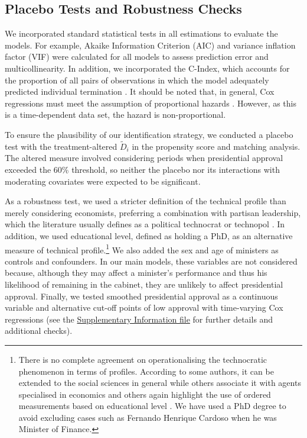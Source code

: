 \documentclass[12pt,halfline,a4paper]{ouparticle}
\begin{document}
\subsection{Placebo Tests and Robustness Checks}
\label{sec3.4}

We incorporated standard statistical tests in all estimations to evaluate the models. For example, Akaike Information Criterion (AIC) and variance inflation factor (VIF) were calculated for all models to assess prediction error and multicollinearity. In addition, we incorporated the C-Index, which accounts for the proportion of all pairs of observations in which the model adequately predicted individual termination \citep[][see also \citeauthor{Adolph2020}, \citeyear{Adolph2020}]{Harrell1996}. It should be noted that, in general, Cox regressions must meet the assumption of proportional hazards \citep{BoxSteffensmeier2004}. However, as this is a time-dependent data set, the hazard is non-proportional. 

To ensure the plausibility of our identification strategy, we conducted a placebo test with the treatment-altered $\widetilde{D}_{i}$ in the propensity score and matching analysis. The altered measure involved considering periods when presidential approval exceeded the 60\% threshold, so neither the placebo nor its interactions with moderating covariates were expected to be significant.

As a robustness test, we used a stricter definition of the technical profile than merely considering economists, preferring a combination with partisan leadership, which the literature usually defines as a political technocrat or technopol \citep{GonzalezBustamante2018, Joignant2011}. In addition, we used educational level, defined as holding a PhD, as an alternative measure of technical profile.\footnote{There is no complete agreement on operationalising the technocratic phenomenon in terms of profiles. According to some authors, it can be extended to the social sciences in general while others associate it with agents specialised in economics and others again highlight the use of ordered measurements based on educational level \citep{Camerlo2015b, Schneider1998, Silva2006}. We have used a PhD degree to avoid excluding cases such as Fernando Henrique Cardoso when he was Minister of Finance.} We also added the sex and age of ministers as controls and confounders. In our main models, these variables are not considered because, although they may affect a minister’s performance and thus his likelihood of remaining in the cabinet, they are unlikely to affect presidential approval. Finally, we tested smoothed presidential approval as a continuous variable and alternative cut-off points of low approval with time-varying Cox regressions (see the \href{https://osf.io/asgbj/?view_only=144acd6c8eca4836880b57dee85ea4ff}{Supplementary Information file} for further details and additional checks).
\end{document}
